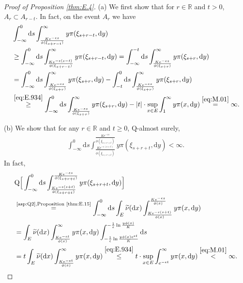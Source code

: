 \documentclass[12pt,a4paper]{amsart}
\numberwithin{equation}{section}
\theoremstyle{plain}
\theoremstyle{definition}
\theoremstyle{remark}
\begin{document}
\begin{proof}[Proof of Proposition \ref{thm:E.4}]
	(a) We first show that for $r\in \mathbb R$ and $t> 0$, $A_r \subset A_{r-t}$.
	In fact,  on the event $A_r$ we have
\begin{align}
	&\int_{-\infty}^0 \mathrm ds \int_{\frac{Ke^{-\epsilon s}}{\phi(\xi_{s+r-t})}}^\infty y\pi(\xi_{s+r-t},\mathrm dy)
	\\&\geq \int_{-\infty}^0 \mathrm ds \int_{\frac{K e^{-\epsilon (s-t)}}{\phi(\xi_{s+r-t})}}^\infty y\pi(\xi_{s+r-t},\mathrm dy)
	= \int_{-\infty}^{-t} \mathrm ds \int_{\frac{K e^{-\epsilon s}}{\phi(\xi_{s+r})}}^\infty y\pi(\xi_{s+r},\mathrm dy)
	\\&= \int_{-\infty}^0 \mathrm ds \int_{\frac{K e^{-\epsilon s}}{\phi(\xi_{s+r})}}^\infty y\pi(\xi_{s+r},\mathrm dy) - \int_{-t}^0 \mathrm ds \int_{\frac{K e^{-\epsilon s}}{\phi(\xi_{s+r})}}^\infty y\pi(\xi_{s+r},\mathrm dy)
	\\&\overset{\eqref{eq:E.934}}\geq \int_{-\infty}^0 \mathrm ds \int_{\frac{K e^{-\epsilon s}}{\phi(\xi_{s+r})}}^\infty y\pi(\xi_{s+r},\mathrm dy) - |t| \cdot \sup_{x\in E} \int_1^\infty y\pi(x,\mathrm dy)
	\overset{\eqref{eq:M.01}}= \infty.
\end{align}

(b) We show that
	for any $r\in \mathbb R$ and $t\geq 0$, $\mathrm Q$-almost surely,
\begin{align}
\label{eq:E.95}
	\int_{-\infty}^0 \mathrm ds \int_{\frac{Ke^{-\epsilon (s+t)}}{\phi(\xi_{s+r+t})}}^\frac{Ke^{-\epsilon s}}{\phi(\xi_{s+r+t})} y\pi(\xi_{s+r+t},\mathrm dy)
	< \infty.
\end{align}
	In fact,
\begin{align}
	&\mathrm Q\Big[ \int_{-\infty}^0 \mathrm ds \int_{\frac{Ke^{-\epsilon (s+t)}}{\phi(\xi_{s+r+t})}}^\frac{Ke^{-\epsilon s}}{\phi(\xi_{s+r+t})} y\pi(\xi_{s+r+t},\mathrm dy) \Big]
	\\&\overset{\text{\eqref{asp:Q2},Proposition \ref{thm:E.15}}} = \int_{-\infty}^0 \mathrm ds \int_E \widetilde \nu(\mathrm dx) \int^{\frac{Ke^{-\epsilon s}}{\phi(x)}}_\frac{Ke^{-\epsilon (s+t)}}{\phi(x)} y\pi(x,\mathrm dy)
	\\&= \int_E \widetilde \nu(\mathrm dx) \int^\infty_\frac{Ke^{-\epsilon t}}{\phi(x)} y\pi(x,\mathrm dy) \int_{-\frac{1}{\epsilon}\ln \frac{y\phi(x) e^{\epsilon t}}{K}}^{-\frac{1}{\epsilon}\ln\frac{y\phi(x)}{K}} \mathrm ds
	\\&= t\int_E \widetilde \nu(\mathrm dx) \int^\infty_\frac{Ke^{-\epsilon t}}{\phi(x)} y\pi(x,\mathrm dy)
	\overset{\eqref{eq:E.934}}\leq t \cdot \sup_{x\in E} \int^\infty_{e^{-\epsilon t}} y\pi(x,\mathrm dy)
	\overset{\eqref{eq:M.01}}< \infty.
\end{align}


\end{proof}
\end{document}
